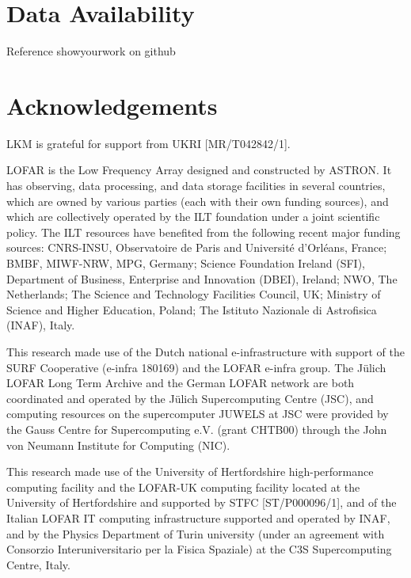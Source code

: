 \documentclass[usenatbib,fleqn,letters]{mnras}
\begin{document}
\section*{Data Availability}
Reference showyourwork on github

\section*{Acknowledgements}
LKM is grateful for support from UKRI [MR/T042842/1]. 

LOFAR is the Low Frequency Array designed and constructed by ASTRON. It has observing, data processing, and data storage facilities in several countries, which are owned by various parties (each with their own funding sources), and which are collectively operated by the ILT foundation under a joint scientific policy. The ILT resources have benefited from the following recent major funding sources: CNRS-INSU, Observatoire de Paris and Université d'Orléans, France; BMBF, MIWF-NRW, MPG, Germany; Science Foundation Ireland (SFI), Department of Business, Enterprise and Innovation (DBEI), Ireland; NWO, The Netherlands; The Science and Technology Facilities Council, UK; Ministry of Science and Higher Education, Poland; The Istituto Nazionale di Astrofisica (INAF), Italy.

This research made use of the Dutch national e-infrastructure with support of the SURF Cooperative (e-infra 180169) and the LOFAR e-infra group. The Jülich LOFAR Long Term Archive and the German LOFAR network are both coordinated and operated by the Jülich Supercomputing Centre (JSC), and computing resources on the supercomputer JUWELS at JSC were provided by the Gauss Centre for Supercomputing e.V. (grant CHTB00) through the John von Neumann Institute for Computing (NIC).

This research made use of the University of Hertfordshire high-performance computing facility and the LOFAR-UK computing facility located at the University of Hertfordshire and supported by STFC [ST/P000096/1], and of the Italian LOFAR IT computing infrastructure supported and operated by INAF, and by the Physics Department of Turin university (under an agreement with Consorzio Interuniversitario per la Fisica Spaziale) at the C3S Supercomputing Centre, Italy.
\end{document}
